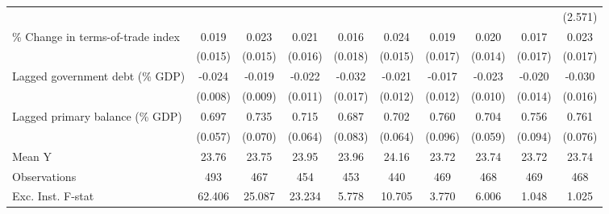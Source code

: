 {\begin{tabular}{l*{9}{c}}
                    &                     &                     &                     &                     &                     &                     &                     &                     &     (2.571)         \\
\addlinespace
\% Change in terms-of-trade index&       0.019         &       0.023         &       0.021         &       0.016         &       0.024         &       0.019         &       0.020         &       0.017         &       0.023         \\
                    &     (0.015)         &     (0.015)         &     (0.016)         &     (0.018)         &     (0.015)         &     (0.017)         &     (0.014)         &     (0.017)         &     (0.017)         \\
\addlinespace
Lagged government debt (\% GDP)&      -0.024\sym{***}&      -0.019\sym{**} &      -0.022\sym{**} &      -0.032\sym{*}  &      -0.021\sym{*}  &      -0.017         &      -0.023\sym{**} &      -0.020         &      -0.030\sym{*}  \\
                    &     (0.008)         &     (0.009)         &     (0.011)         &     (0.017)         &     (0.012)         &     (0.012)         &     (0.010)         &     (0.014)         &     (0.016)         \\
\addlinespace
Lagged primary balance (\% GDP)&       0.697\sym{***}&       0.735\sym{***}&       0.715\sym{***}&       0.687\sym{***}&       0.702\sym{***}&       0.760\sym{***}&       0.704\sym{***}&       0.756\sym{***}&       0.761\sym{***}\\
                    &     (0.057)         &     (0.070)         &     (0.064)         &     (0.083)         &     (0.064)         &     (0.096)         &     (0.059)         &     (0.094)         &     (0.076)         \\
\midrule
Mean Y              &       23.76         &       23.75         &       23.95         &       23.96         &       24.16         &       23.72         &       23.74         &       23.72         &       23.74         \\
Observations        &         493         &         467         &         454         &         453         &         440         &         469         &         468         &         469         &         468         \\
Exc. Inst. F-stat   &      62.406         &      25.087         &      23.234         &       5.778         &      10.705         &       3.770         &       6.006         &       1.048         &       1.025         \\
\bottomrule
\end{tabular}
}
